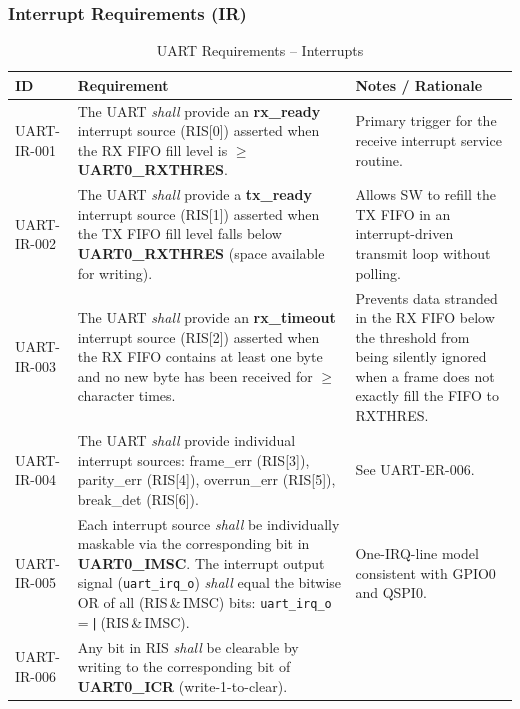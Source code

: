 \subsubsection{Interrupt Requirements (IR)}

\begin{table}[H]
\caption{UART Requirements -- Interrupts}
\label{tab:asUartReqIR}
\centering
\begin{tabularx}{\textwidth}{|l |X |X|}
  \hline
  ID & Requirement & Notes / Rationale \\
  \hline
  \hline
  UART-IR-001 &
    The UART \textit{shall} provide an \textbf{rx\_ready} interrupt source
    (RIS[0]) asserted when the RX FIFO fill level is $\geq$
    \textbf{UART0\_RXTHRES}. &
    Primary trigger for the receive interrupt service routine. \\
  \hline
  UART-IR-002 &
    The UART \textit{shall} provide a \textbf{tx\_ready} interrupt source
    (RIS[1]) asserted when the TX FIFO fill level falls below
    \textbf{UART0\_RXTHRES} (space available for writing). &
    Allows SW to refill the TX FIFO in an interrupt-driven transmit loop
    without polling. \\
  \hline
  UART-IR-003 &
    The UART \textit{shall} provide an \textbf{rx\_timeout} interrupt source
    (RIS[2]) asserted when the RX FIFO contains at least one byte and no
    new byte has been received for $\geq$\;4 character times. &
    Prevents data stranded in the RX FIFO below the threshold from being
    silently ignored when a frame does not exactly fill the FIFO to RXTHRES. \\
  \hline
  UART-IR-004 &
    The UART \textit{shall} provide individual interrupt sources:
    frame\_err (RIS[3]), parity\_err (RIS[4]),
    overrun\_err (RIS[5]), break\_det (RIS[6]). &
    See UART-ER-006. \\
  \hline
  UART-IR-005 &
    Each interrupt source \textit{shall} be individually maskable via
    the corresponding bit in \textbf{UART0\_IMSC}.
    The interrupt output signal (\texttt{uart\_irq\_o})
    \textit{shall} equal the bitwise OR of all (RIS\,\&\,IMSC) bits:
    \texttt{uart\_irq\_o}\,=\,\texttt{|}\,(RIS\,\&\,IMSC). &
    One-IRQ-line model consistent with GPIO0 and QSPI0. \\
  \hline
  UART-IR-006 &
    Any bit in RIS \textit{shall} be clearable by writing\;1 to the
    corresponding bit of \textbf{UART0\_ICR} (write-1-to-clear). &

\end{tabularx}
\end{table}
